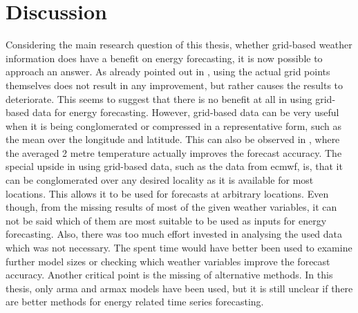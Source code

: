 \chapter{Discussion}
\label{ch:discussion}

Considering the main research question of this thesis, whether grid-based weather information does have a benefit on energy forecasting, it is now possible to approach an answer. As already pointed out in , using the actual grid points themselves does not result in any improvement, but rather causes the results to deteriorate. This seems to suggest that there is no benefit at all in using grid-based data for energy forecasting. However, grid-based data can be very useful when it is being conglomerated or compressed in a representative form, such as the mean over the longitude and latitude. This can also be observed in , where the averaged 2 metre temperature actually improves the forecast accuracy. The special upside in using grid-based data, such as the data from \gls{ecmwf}, is, that it can be conglomerated over any desired locality as it is available for most locations. This allows it to be used for forecasts at arbitrary locations. Even though, from the missing results of most of the given weather variables, it can not be said which of them are most suitable to be used as inputs for energy forecasting. Also, there was too much effort invested in analysing the used data which was not necessary. The spent time would have better been used to examine further model sizes or checking which weather variables improve the forecast accuracy. Another critical point is the missing of alternative methods. In this thesis, only \gls{arma} and \gls{armax} models have been used, but it is still unclear if there are better methods for energy related time series forecasting.\\

%
